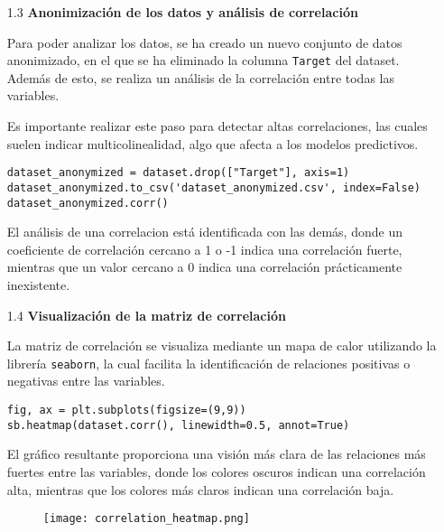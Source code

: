 \documentclass{article}
\begin{document}
\bigskip

\begin{itemize}

\item[1.3]  {\bf Anonimizaci\'on de los datos y an\'alisis de correlaci\'on}

Para poder analizar los datos, se ha creado un nuevo conjunto de datos anonimizado, en el que se ha eliminado la columna \texttt{Target} del dataset. Adem\'as de esto, se realiza un an\'alisis de la correlaci\'on entre todas las variables.

Es importante realizar este paso para detectar altas correlaciones, las cuales suelen indicar multicolinealidad, algo que afecta a los modelos predictivos.

\begin{tcolorbox}[width=14cm]
\begin{scriptsize}
\begin{verbatim}
dataset_anonymized = dataset.drop(["Target"], axis=1)
dataset_anonymized.to_csv('dataset_anonymized.csv', index=False)
dataset_anonymized.corr()
\end{verbatim}
\end{scriptsize}
\end{tcolorbox}

El an\'alisis de una correlacion est\'a identificada con las dem\'as, donde un coeficiente de correlaci\'on cercano a 1 o -1 indica una correlaci\'on fuerte, mientras que un valor cercano a 0 indica una correlaci\'on pr\'acticamente inexistente.

\end{itemize}

\newpage

\begin{itemize}

\item[1.4]  {\bf Visualizaci\'on de la matriz de correlaci\'on}

La matriz de correlaci\'on se visualiza mediante un mapa de calor utilizando la librer\'ia \texttt{seaborn}, la cual facilita la identificaci\'on de relaciones positivas o negativas entre las variables.

\begin{tcolorbox}[width=14cm]
\begin{scriptsize}
\begin{verbatim}
fig, ax = plt.subplots(figsize=(9,9))
sb.heatmap(dataset.corr(), linewidth=0.5, annot=True)
\end{verbatim}
\end{scriptsize}
\end{tcolorbox}

El gr\'afico resultante proporciona una visi\'on m\'as clara de las relaciones m\'as fuertes entre las variables, donde los colores oscuros indican una correlaci\'on alta, mientras que los colores m\'as claros indican una correlaci\'on baja.

\begin{figure}[h]
  \centering
  \texttt{[image: correlation\_heatmap.png]}
\end{figure}

\end{itemize}
\end{document}
